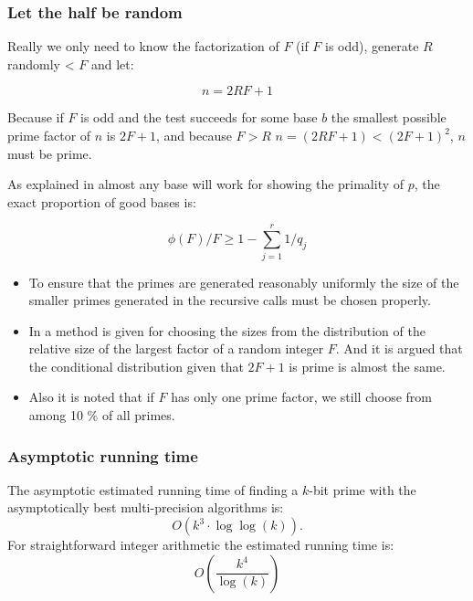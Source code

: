 \documentclass{beamer}
\begin{document}
\begin{frame}
\frametitle{Let the half be random}
Really we only need to know the factorization of $F$ (if $F$ is odd),
generate $R$ randomly < $F$ and let:

\[n = 2RF+1\] 

Because if $F$
is odd and the test succeeds for some base $b$ the smallest possible
prime factor of $n$ is $2F+1$, and because $F>R$ $n=(2RF+1)<(2F+1)^2$,
$n$ must be prime.
\end{frame}
\begin{frame}
As explained in \cite{Mihailescu:1994:FGP} almost any base will work
for showing the primality of $p$, the exact proportion of good bases
is:

\[\phi(F)/F \geq 1-\sum^r_{j=1}1/q_j\]
\end{frame}
\begin{frame}
  \begin{itemize}
\item 
    To ensure that the primes are generated reasonably uniformly the
    size of the smaller primes generated in the recursive calls must
    be chosen properly.
\pause
\item
    In \cite{Mihailescu:1994:FGP} a method is given for choosing the
    sizes from the distribution of the relative size of the largest
    factor of a random integer $F$. And it is argued that the
    conditional distribution given that $2F+1$ is prime is almost the
    same.
\pause
\item
    Also it is noted that if $F$ has only one prime factor, we still
    choose from among 10 \% of all primes.
    
  \end{itemize}
\end{frame}
\begin{frame}
  \frametitle{Asymptotic running time}
The asymptotic estimated running time of finding a $k$-bit prime with the
asymptotically best multi-precision algorithms is:
\[O(k^3\cdot\log\log(k)).\]
For straightforward integer arithmetic the estimated running time is:
\[O(\frac{k^{4}}{\log(k)})\]
\end{frame}
\end{document}
